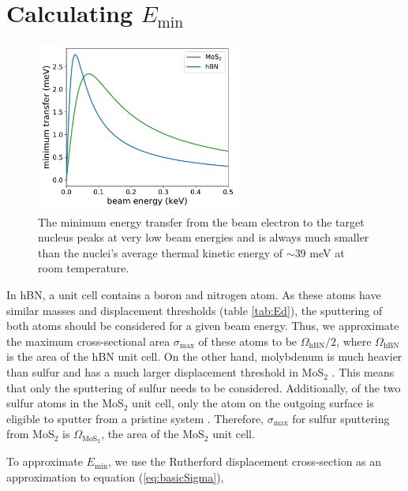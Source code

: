 \documentclass{article}
\begin{document}
\section{Calculating $E_\text{min}$}
\label{app:Emin}

\begin{figure}[H]
  \centering
  \includegraphics[width=0.6\textwidth]{figS5.pdf}
  \caption{
    The minimum energy transfer from the beam electron to the target nucleus
    peaks at very low beam energies and is always much smaller than the
    nuclei's average thermal kinetic energy of $\sim$39 meV at room
    temperature. 
  }
  \label{fig:Emin}
\end{figure}

In hBN, a unit cell contains a boron and nitrogen atom.
As these atoms have similar masses and displacement thresholds (table
\ref{tab:Ed}), the sputtering of both atoms should be considered for a given
beam energy.
Thus, we approximate the maximum cross-sectional area $\sigma_\text{max}$ of
these atoms to be $\Omega_\text{hBN}/2$, where $\Omega_\text{hBN}$ is the area
of the hBN unit cell.
On the other hand, molybdenum is much heavier than sulfur and has a much larger
displacement threshold in MoS$_2$ \cite{Komsa2012}.  
This means that only the sputtering of sulfur needs to be considered.
Additionally, of the two sulfur atoms in the MoS$_2$ unit cell, only the atom
on the outgoing surface is eligible to sputter from a pristine system
\cite{Komsa2012}.
Therefore, $\sigma_\text{max}$ for sulfur sputtering from MoS$_2$ is
$\Omega_\text{MoS$_2$}$, the area of the MoS$_2$ unit cell.

To approximate $E_\text{min}$, we use the Rutherford displacement cross-section
\cite{Thornton2004, Sakurai2011, Yoshimura2018} as an approximation to equation
(\ref{eq:basicSigma}),
\end{document}
